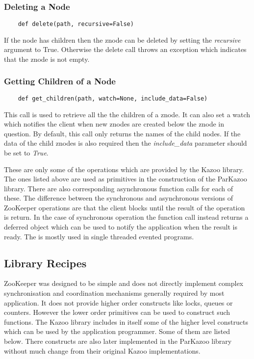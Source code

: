   \subsubsection{Deleting a Node}
  \begin{lstlisting}
    def delete(path, recursive=False)
  \end{lstlisting}
  If the node has children then the znode can be deleted by setting the \textit{recursive} argument to True. Otherwise the delete call throws an exception which indicates that the znode is not empty.
  
  \subsubsection{Getting Children of a Node}
  \begin{lstlisting}
    def get_children(path, watch=None, include_data=False)
  \end{lstlisting}
  This call is used to retrieve all the the children of a znode. It can also set a watch which notifies the client when new znodes are created below the znode in question. By default, this call only returns the names of the child nodes. If the data of the child znodes is also required then the \textit{include\_data} parameter should be set to \textit{True}.
  
  These are only some of the operations which are provided by the Kazoo library. The ones listed above are used as primitives in the construction of the ParKazoo library. There are also corresponding asynchronous function calls for each of these. The difference between the synchronous and asynchronous versions of ZooKeeper operations are that the client blocks until the result of the operation is return. In the case of synchronous operation the function call instead returns a deferred object which can be used to notify the application when the result is ready. The is mostly used in single threaded evented programs.
  
\subsection{Library Recipes}
  ZooKeeper was designed to be simple and does not directly implement complex synchronisation and coordination mechanisms generally required by most application. It does not provide higher order constructs like locks, queues or counters. However the lower order primitives can be used to construct such functions. The Kazoo library includes in itself some of the higher level constructs which can be used by the application programmer. Some of them are listed below. There constructs are also later implemented in the ParKazoo library without much change from their original Kazoo implementations.
  
